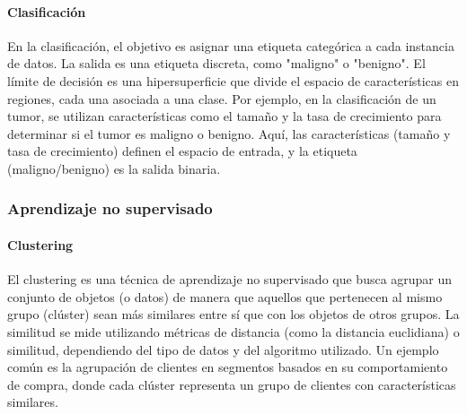 \paragraph{Clasificación} En la clasificación, el objetivo es asignar una etiqueta categórica a cada instancia de datos. La salida es una etiqueta discreta, como "maligno" o "benigno". El límite de decisión es una hipersuperficie que divide el espacio de características en regiones, cada una asociada a una clase. Por ejemplo, en la clasificación de un tumor, se utilizan características como el tamaño y la tasa de crecimiento para determinar si el tumor es maligno o benigno. Aquí, las características (tamaño y tasa de crecimiento) definen el espacio de entrada, y la etiqueta (maligno/benigno) es la salida binaria.

\subsubsection{Aprendizaje no supervisado}
\paragraph{Clustering} El clustering es una técnica de aprendizaje no supervisado que busca agrupar un conjunto de objetos (o datos) de manera que aquellos que pertenecen al mismo grupo (clúster) sean más similares entre sí que con los objetos de otros grupos. La similitud se mide utilizando métricas de distancia (como la distancia euclidiana) o similitud, dependiendo del tipo de datos y del algoritmo utilizado. Un ejemplo común es la agrupación de clientes en segmentos basados en su comportamiento de compra, donde cada clúster representa un grupo de clientes con características similares.


